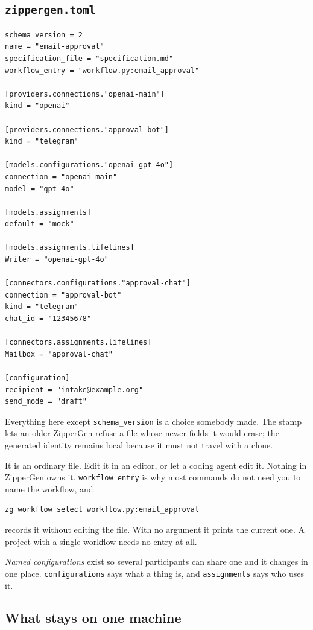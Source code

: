 \documentclass[11pt,a4paper]{article}
\begin{document}
\subsection{\texttt{zippergen.toml}}

\begin{lstlisting}
schema_version = 2
name = "email-approval"
specification_file = "specification.md"
workflow_entry = "workflow.py:email_approval"

[providers.connections."openai-main"]
kind = "openai"

[providers.connections."approval-bot"]
kind = "telegram"

[models.configurations."openai-gpt-4o"]
connection = "openai-main"
model = "gpt-4o"

[models.assignments]
default = "mock"

[models.assignments.lifelines]
Writer = "openai-gpt-4o"

[connectors.configurations."approval-chat"]
connection = "approval-bot"
kind = "telegram"
chat_id = "12345678"

[connectors.assignments.lifelines]
Mailbox = "approval-chat"

[configuration]
recipient = "intake@example.org"
send_mode = "draft"
\end{lstlisting}

Everything here except \texttt{schema\_version} is a choice somebody made. The
stamp lets an older ZipperGen refuse a file whose newer fields it would erase;
the generated identity remains local because it must not travel with a clone.

It is an ordinary file. Edit it in an editor, or let a coding agent edit it.
Nothing in ZipperGen owns it. \texttt{workflow\_entry} is why most commands do
not need you to name the workflow, and

\begin{lstlisting}[style=shell]
zg workflow select workflow.py:email_approval
\end{lstlisting}

records it without editing the file. With no argument it prints the current
one. A project with a single workflow needs no entry at all.

\emph{Named configurations} exist so several participants can share one and it
changes in one place. \texttt{configurations} says what a thing is, and
\texttt{assignments} says who uses it.

\subsection{What stays on one machine}
\end{document}
